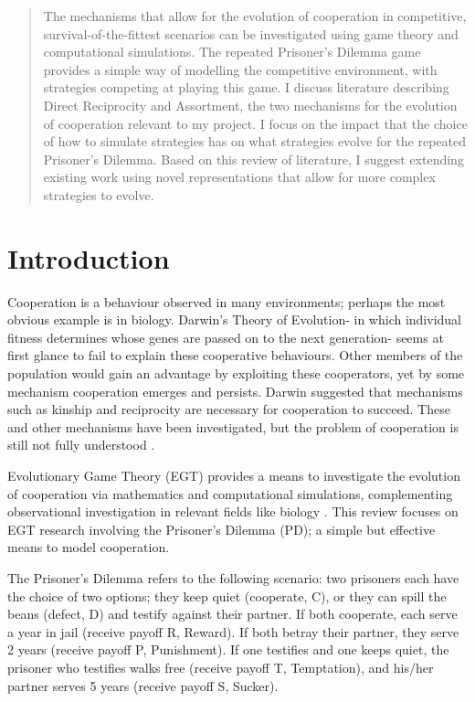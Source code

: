 \documentclass[a4paper,11pt]{article}
\begin{document}
\newpage
\setcounter{page}{1}
\renewcommand{\thepage}{\arabic{page}}
\renewcommand{\abstractname}{}
\begin{abstract}
The mechanisms that allow for the evolution of cooperation in competitive, survival-of-the-fittest scenarios can be investigated using game theory and computational simulations. 
The repeated Prisoner’s Dilemma game provides a simple way of modelling the competitive environment, with strategies competing at playing this game. 
I discuss literature describing Direct Reciprocity and Assortment, the two mechanisms for the evolution of cooperation relevant to my project. 
I focus on the impact that the choice of how to simulate strategies has on what strategies evolve for the repeated Prisoner's Dilemma. 
Based on this review of literature, I suggest extending existing work using novel representations that allow for more complex strategies to evolve. 
\end{abstract}

\section{Introduction}
Cooperation is a behaviour observed in many environments; perhaps the most obvious example is in biology. 
Darwin's Theory of Evolution- in which individual fitness determines whose genes are passed on to the next generation- seems at first glance to fail to explain these cooperative behaviours. 
Other members of the population would gain an advantage by exploiting these cooperators, yet by some mechanism cooperation emerges and persists. 
Darwin suggested that mechanisms such as kinship and reciprocity are necessary for cooperation to succeed. 
These and other mechanisms have been investigated, but the problem of cooperation is still not fully understood \citep{pennisi2005did}. 

Evolutionary Game Theory (EGT) provides a means to investigate the evolution of cooperation via mathematics and computational simulations, complementing observational investigation in relevant fields like biology \citep{dawkins2006selfish}. This review focuses on EGT research involving the Prisoner's Dilemma (PD); a simple but effective means to model cooperation. 

The Prisoner's Dilemma refers to the following scenario: two prisoners each have the choice of two options; they keep quiet (cooperate, C), or they can spill the beans (defect, D) and testify against their partner. If both cooperate, each serve a year in jail (receive payoff R, Reward). If both betray their partner, they serve 2 years (receive payoff P, Punishment). If one testifies and one keeps quiet, the prisoner who testifies walks free (receive payoff T, Temptation), and his/her partner serves 5 years (receive payoff S, Sucker). 
\end{document}
